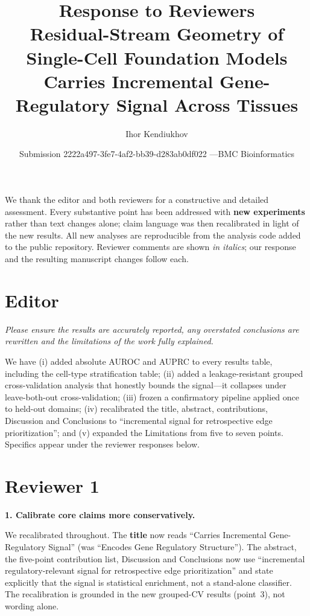\documentclass[11pt]{article}
\title{\vspace{-2em}Response to Reviewers\\[0.3em]
\large Residual-Stream Geometry of Single-Cell Foundation Models\\
Carries Incremental Gene-Regulatory Signal Across Tissues}
\author{Ihor Kendiukhov}
\date{Submission 2222a497-3fe7-4af2-bb39-d283ab0df022 \quad---\quad BMC Bioinformatics}
\newcommand{\reviewer}[1]{\medskip\noindent\textit{\color{revcol}#1}\par\medskip}
\newcommand{\rc}[1]{\medskip\noindent\textbf{#1}\par}
\begin{document}
\maketitle

We thank the editor and both reviewers for a constructive and detailed
assessment. Every substantive point has been addressed with \textbf{new
experiments} rather than text changes alone; claim language was then recalibrated
in light of the new results. All new analyses are reproducible from the analysis
code added to the public repository. Reviewer comments are
shown \textit{\color{revcol}in italics}; our response and the resulting
manuscript changes follow each.

\section{Editor}

\reviewer{Please ensure the results are accurately reported, any overstated
conclusions are rewritten and the limitations of the work fully explained.}

We have (i) added absolute AUROC and AUPRC to every results table, including the
cell-type stratification table; (ii) added a leakage-resistant grouped
cross-validation analysis that honestly bounds the signal---it collapses under
leave-both-out cross-validation; (iii) frozen a confirmatory pipeline applied
once to held-out domains; (iv) recalibrated the title, abstract, contributions,
Discussion and Conclusions to ``incremental signal for retrospective edge
prioritization''; and (v) expanded the Limitations from five to seven points.
Specifics appear under the reviewer responses below.

\section{Reviewer 1}

\rc{1. Calibrate core claims more conservatively.}
We recalibrated throughout. The \textbf{title} now reads ``Carries Incremental
Gene-Regulatory Signal'' (was ``Encodes Gene Regulatory Structure''). The
abstract, the five-point contribution list, Discussion and Conclusions now use
``incremental regulatory-relevant signal for retrospective edge prioritization''
and state explicitly that the signal is statistical enrichment, not a
stand-alone classifier. The recalibration is grounded in the new grouped-CV
results (point~3), not wording alone.
\end{document}
